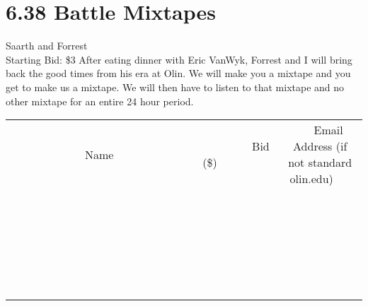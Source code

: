 \documentclass[11pt]{article}
\begin{document}
\section*{6.38 Battle Mixtapes}
Saarth and Forrest
\\
Starting Bid: \$3
\newline
After eating dinner with Eric VanWyk, Forrest and I will bring back the good times from his era at Olin. We will make you a mixtape and you get to make us a mixtape. We will then have to listen to that mixtape and no other mixtape for an entire 24 hour period.
\\[6ex]
\begin{tabular}{c c c}
~~~~~~~~~~~~~Name~~~~~~~~~~~~~ & ~~~~~~~~~Bid (\$)~~~~~~~~~  & ~~~Email Address (if not standard olin.edu)~~~\\
 & & \\
\hline
 & & \\
\hline
 & & \\
\hline
 & & \\
\hline
 & & \\
\hline
 & & \\
\hline
 & & \\
\hline
 & & \\
\hline
 & & \\
\hline
 & & \\
\hline
 & & \\
\hline
 & & \\
\hline
 & & \\
\hline
 & & \\
\hline
 & & \\
\hline
 & & \\
\hline
 & & \\
\hline
 & & \\
\hline
 & & \\
\hline
 & & \\
\hline
 & & \\
\hline
 & & \\
\hline
 & & \\
\hline
 & & \\
\hline
 & & \\
\hline
 & & \\
\hline
\end{tabular}
\newpage
\end{document}

